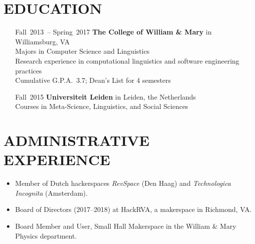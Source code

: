 \documentclass{res}     %
\begin{document}
\begin{resume}
\section{EDUCATION}
\vspace{5mm}
\begin{itemize}[font=\itshape,align=parleft,labelwidth=3cm,leftmargin=2cm]
    \item[Fall~2013~-- Spring~2017]
        \textbf{The College of William \& Mary} in Williamsburg, VA
        \\ Majors in
        Computer Science and Linguistics %
        \\ Research experience in computational linguistics and software engineering practices
        \\ Cumulative G.P.A.\ 3.7; Dean's List for 4 semesters
    \item[Fall~2015]
        \textbf{Universiteit Leiden} in Leiden, the Netherlands
        \\ Courses in
        Meta-Science, Linguistics, and Social Sciences %
\end{itemize}

\section{ADMINISTRATIVE EXPERIENCE}
\vspace{5mm}
\begin{itemize}[leftmargin=5mm]
\item Member of Dutch hackerspaces \emph{RevSpace} (Den Haag) and \emph{Technologica Incognita} (Amsterdam).
\item Board of Directors (2017--2018) at HackRVA, a makerspace in Richmond, VA.
\item Board Member and User, Small Hall Makerspace in the William \& Mary Physics department.
\end{itemize}


\end{resume}
\end{document}
